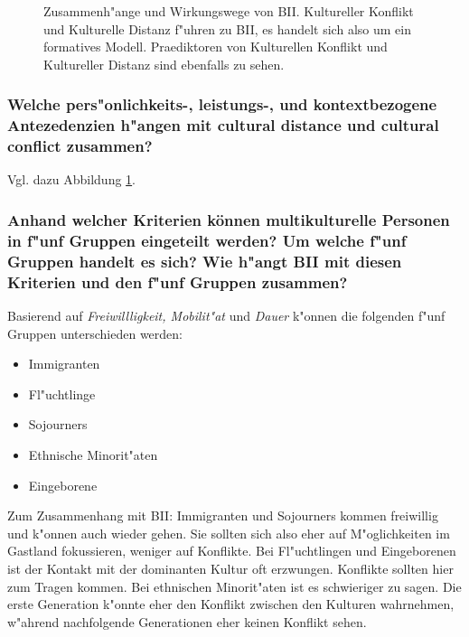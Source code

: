 \begin{figure}[<+htpb+>]
\begin{center}
        \end{center}
        \caption{Zusammenh"ange und Wirkungswege von BII. Kultureller Konflikt und Kulturelle Distanz f"uhren zu BII, es handelt sich also um ein formatives Modell. Praediktoren von Kulturellen Konflikt und Kultureller Distanz sind ebenfalls zu sehen.}
        \label{fig:bii}
\end{figure}

\subsubsection{Welche pers"onlichkeits-, leistungs-, und kontextbezogene Antezedenzien h"angen mit cultural distance und cultural conflict zusammen?}
Vgl. dazu Abbildung \ref{fig:bii}.

\subsubsection{Anhand welcher Kriterien können multikulturelle Personen in f"unf Gruppen eingeteilt werden? Um welche f"unf Gruppen handelt es sich? Wie h"angt BII mit diesen Kriterien und den f"unf Gruppen zusammen?}
Basierend auf \emph{Freiwillligkeit, Mobilit"at} und \emph{Dauer} k"onnen die folgenden f"unf Gruppen unterschieden werden:
\begin{itemize}
        \item Immigranten
        \item Fl"uchtlinge
        \item Sojourners
        \item Ethnische Minorit"aten
        \item Eingeborene
\end{itemize}

Zum Zusammenhang mit BII: Immigranten und Sojourners kommen freiwillig und k"onnen auch wieder gehen. Sie sollten sich also eher auf M"oglichkeiten im Gastland fokussieren, weniger auf Konflikte. Bei Fl"uchtlingen und Eingeborenen ist der Kontakt mit der dominanten Kultur oft erzwungen. Konflikte sollten hier zum Tragen kommen. Bei ethnischen Minorit"aten ist es schwieriger zu sagen. Die erste Generation k"onnte eher den Konflikt zwischen den Kulturen wahrnehmen, w"ahrend nachfolgende Generationen eher keinen Konflikt sehen.

